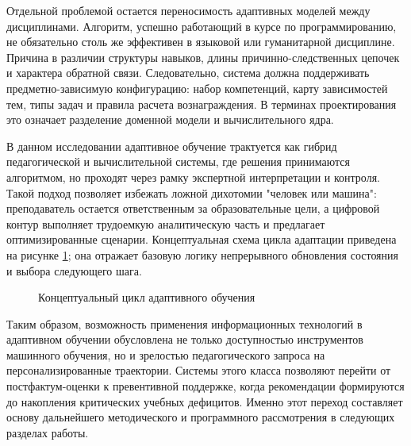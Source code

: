 Отдельной проблемой остается переносимость адаптивных моделей между
дисциплинами. Алгоритм, успешно работающий в курсе по программированию, не
обязательно столь же эффективен в языковой или гуманитарной дисциплине. Причина
в различии структуры навыков, длины причинно-следственных цепочек и характера
обратной связи. Следовательно, система должна поддерживать предметно-зависимую
конфигурацию: набор компетенций, карту зависимостей тем, типы задач и правила
расчета вознаграждения. В терминах проектирования это означает разделение
доменной модели и вычислительного ядра.

В данном исследовании адаптивное обучение трактуется как гибрид педагогической
и вычислительной системы, где решения принимаются алгоритмом, но проходят через
рамку экспертной интерпретации и контроля. Такой подход позволяет избежать
ложной дихотомии "человек или машина": преподаватель остается ответственным за
образовательные цели, а цифровой контур выполняет трудоемкую аналитическую
часть и предлагает оптимизированные сценарии. Концептуальная схема цикла
адаптации приведена на рисунке \ref{fig:adaptive-cycle}; она отражает базовую
логику непрерывного обновления состояния и выбора следующего шага.

\begin{figure}[htbp]
  \centering


  \caption{Концептуальный цикл адаптивного обучения}
  \label{fig:adaptive-cycle}
\end{figure}

Таким образом, возможность применения информационных технологий в адаптивном
обучении обусловлена не только доступностью инструментов машинного обучения, но
и зрелостью педагогического запроса на персонализированные траектории. Системы
этого класса позволяют перейти от постфактум-оценки к превентивной поддержке,
когда рекомендации формируются до накопления критических учебных дефицитов.
Именно этот переход составляет основу дальнейшего методического и программного
рассмотрения в следующих разделах работы.
